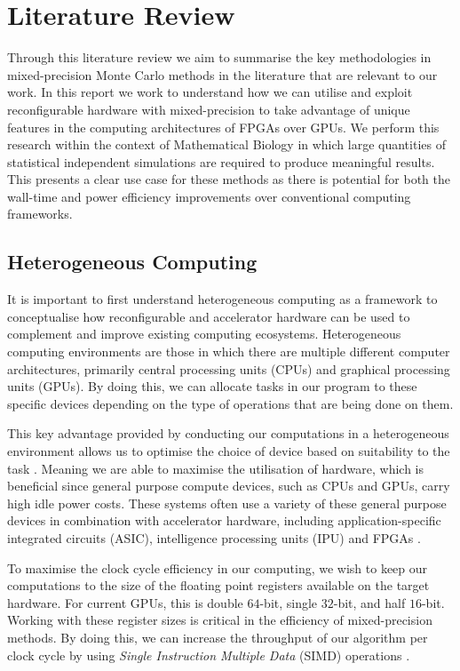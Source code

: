 \section{Literature Review}
Through this literature review we aim to summarise the key methodologies in mixed-precision Monte Carlo methods in the literature that are relevant to our work. In this report we work to understand how we can utilise and exploit reconfigurable hardware with mixed-precision to take advantage of unique features in the computing architectures of FPGAs over GPUs. We perform this research within the context of Mathematical Biology in which large quantities of statistical independent simulations are required to produce meaningful results. This presents a clear use case for these methods as there is potential for both the wall-time and power efficiency improvements over conventional computing frameworks. 

\subsection{Heterogeneous Computing}\label{sec:heterogeneous_computing}
It is important to first understand heterogeneous computing as a framework to conceptualise how reconfigurable and accelerator hardware can be used to complement and improve existing computing ecosystems. Heterogeneous computing environments are those in which there are multiple different computer architectures, primarily central processing units (CPUs) and graphical processing units (GPUs). By doing this, we can allocate tasks in our program to these specific devices depending on the type of operations that are being done on them. 

This key advantage provided by conducting our computations in a heterogeneous environment allows us to optimise the choice of device based on suitability to the task \cite{macintoshImplementingEvaluatingHeterogeneous2019, warneHeterogeneousComputingApproach2016, macintoshImplementationParallelTridiagonal2016}. Meaning we are able to maximise the utilisation of hardware, which is beneficial since general purpose compute devices, such as CPUs and GPUs, carry high idle power costs. These systems often use a variety of these general purpose devices in combination with accelerator hardware, including application-specific integrated circuits (ASIC), intelligence processing units (IPU) and FPGAs \cite{cardosoChapter2Highperformance2017}. 

To maximise the clock cycle efficiency in our computing, we wish to keep our computations to the size of the floating point registers available on the target hardware. For current GPUs, this is double $64$-bit, single $32$-bit, and half $16$-bit. Working with these register sizes is critical in the efficiency of mixed-precision methods. By doing this, we can increase the throughput of our algorithm per clock cycle by using \textit{Single Instruction Multiple Data} (SIMD) operations \cite{warnePulsecoupledNeuralNetwork2014, warneSolvingTriDiagonalLinear}. 


